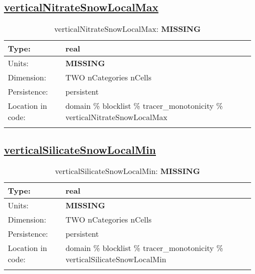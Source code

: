 \subsection[verticalNitrateSnowLocalMax]{\hyperref[sec:var_tab_tracer_monotonicity]{verticalNitrateSnowLocalMax}}
\label{subsec:var_sec_tracer_monotonicity_verticalNitrateSnowLocalMax}
\begin{center}
\begin{longtable}{| p{2.0in} | p{4.0in} |}
        \hline 
        Type: & real \\
        \hline 
        Units: & {\bf \color{red} MISSING} \\
        \hline 
        Dimension: & TWO nCategories nCells \\
        \hline 
        Persistence: & persistent \\
        \hline 
         Location in code: & domain \% blocklist \% tracer\_monotonicity \% verticalNitrateSnowLocalMax \\
         \hline 
    \caption{verticalNitrateSnowLocalMax: {\bf \color{red} MISSING}}
\end{longtable}
\end{center}
\subsection[verticalSilicateSnowLocalMin]{\hyperref[sec:var_tab_tracer_monotonicity]{verticalSilicateSnowLocalMin}}
\label{subsec:var_sec_tracer_monotonicity_verticalSilicateSnowLocalMin}
\begin{center}
\begin{longtable}{| p{2.0in} | p{4.0in} |}
        \hline 
        Type: & real \\
        \hline 
        Units: & {\bf \color{red} MISSING} \\
        \hline 
        Dimension: & TWO nCategories nCells \\
        \hline 
        Persistence: & persistent \\
        \hline 
         Location in code: & domain \% blocklist \% tracer\_monotonicity \% verticalSilicateSnowLocalMin \\
         \hline 
    \caption{verticalSilicateSnowLocalMin: {\bf \color{red} MISSING}}
\end{longtable}
\end{center}
